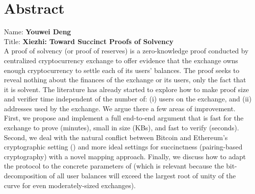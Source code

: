 
\chapter*{Abstract}

Name: 	\tab \textbf{Youwei Deng} \\
Title: 	\tab \textbf{Xiezhi: Toward Succinct Proofs of Solvency}\\

A proof of solvency (or proof of reserves) is a zero-knowledge proof conducted by centralized cryptocurrency exchange to offer evidence that the exchange owns enough cryptocurrency to settle each of its users' balances. The proof seeks to reveal nothing about the finances of the exchange or its users, only the fact that it is solvent. The literature has already started to explore how to make proof size and verifier time independent of the number of: (i) users on the exchange, and (ii) addresses used by the exchange. We argue there a few areas of improvement. First, we propose and implement a full end-to-end argument that is fast for the exchange to prove (minutes), small in size (KBs), and fast to verify (seconds). Second, we deal with the natural conflict between Bitcoin and Ethereum's cryptographic setting (\secp) and more ideal settings for succinctness (\eg pairing-based cryptography) with a novel mapping approach. Finally, we discuss how to adapt the protocol to the concrete parameters of \bls (which is relevant because the bit-decomposition of all user balances will exceed the largest root of unity of the curve for even moderately-sized exchanges).
